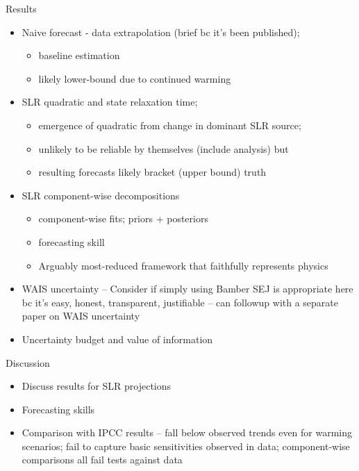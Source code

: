 \documentclass[11pt]{article}
\begin{document}
\item{Results}
\begin{itemize}

	\item Naive forecast - data extrapolation (brief bc it's been published); 
	\begin{itemize}
		\item baseline estimation
		\item  likely lower-bound due to continued warming 
	\end{itemize}
	
	\item SLR quadratic and state relaxation time; 
	\begin{itemize}
		\item emergence of quadratic from change in dominant SLR source; 
		\item unlikely to be reliable by themselves (include analysis) but 
		\item resulting forecasts likely bracket (upper bound) truth 
	\end{itemize}
	
	\item SLR component-wise decompositions
	\begin{itemize}
		\item component-wise fits; priors + posteriors 
		\item forecasting skill 
		\item Arguably most-reduced framework that faithfully represents physics 
	\end{itemize}
	
	\item WAIS uncertainty -- Consider if simply using Bamber SEJ is appropriate here bc it's easy, honest, transparent, justifiable -- can followup with a separate paper on WAIS uncertainty 
	
	\item Uncertainty budget and value of information 
	
\end{itemize}


\item{Discussion}
\begin{itemize}
	\item Discuss results for SLR projections 
	\item Forecasting skills 
	\item Comparison with IPCC results -- fall below observed trends even for warming scenarios; fail to capture basic sensitivities observed in data; component-wise comparisons all fail tests against data 
\end{itemize}
\end{document}
